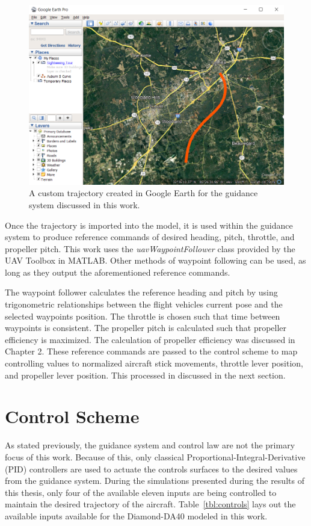 \begin{figure}[!ht]
    \centering
    \includegraphics[width=0.75\linewidth]{Figures/auburnScurve.png}
    \caption{A custom trajectory created in Google Earth for the guidance system discussed in this work.}\label{fig:googleEarth}
\end{figure}

Once the trajectory is imported into the model, it is used within the guidance system to produce reference commands of desired heading, pitch, throttle, and propeller pitch. This work uses the \textit{uavWaypointFollower} class provided by the UAV Toolbox in MATLAB\@. Other methods of waypoint following can be used, as long as they output the aforementioned reference commands.

The waypoint follower calculates the reference heading and pitch by using trigonometric relationships between the flight vehicles current pose and the selected waypoints position. The throttle is chosen such that time between waypoints is consistent. The propeller pitch is calculated such that propeller efficiency is maximized. The calculation of propeller efficiency was discussed in Chapter 2. These reference commands are passed to the control scheme to map controlling values to normalized aircraft stick movements, throttle lever position, and propeller lever position. This processed in discussed in the next section.

\section{Control Scheme}

As stated previously, the guidance system and control law are not the primary focus of this work. Because of this, only classical Proportional-Integral-Derivative (PID) controllers are used to actuate the controls surfaces to the desired values from the guidance system. During the simulations presented during the results of this thesis, only four of the available eleven inputs are being controlled to maintain the desired trajectory of the aircraft. Table~\ref{tbl:controls} lays out the available inputs available for the Diamond-DA40 modeled in this work.

